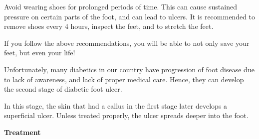 {\begin{figure}\end{figure}

 \item 
 Avoid wearing shoes for prolonged periods of time. This can cause sustained pressure on certain parts of the foot, and can lead to ulcers. It is recommended to remove shoes every 4 hours, inspect the feet, and to stretch the feet.

\begin{figure}\end{figure}

If you follow the above recommendations, you will be able to not only save your feet, but even your life!


Unfortunately, many diabetics in our country have progression of foot disease due to lack of awareness, and lack of proper medical care. Hence, they can develop the second stage of diabetic foot ulcer.

In this stage, the skin that had a callus in the first stage later develops a superficial ulcer. Unless treated properly, the ulcer spreads deeper into the foot.

\textbf{Treatment}

}
